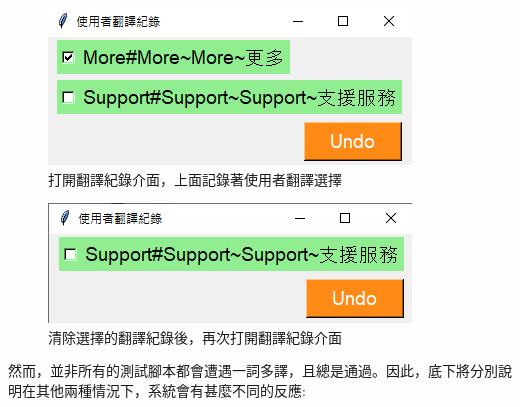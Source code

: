 \begin{figure}[H]
\centering
\includegraphics[width= .5\textwidth]{../論文截圖/4-3-4 介面上記錄著使用者翻譯選擇.png}
\caption{打開翻譯紀錄介面，上面記錄著使用者翻譯選擇}
\end{figure}

\begin{figure}[H]
\centering
\includegraphics[width= .5\textwidth]{../論文截圖/4-3-5 將選擇的翻譯清除後，再次打開翻譯紀錄介面.png}
\caption{清除選擇的翻譯紀錄後，再次打開翻譯紀錄介面}
\end{figure}

然而，並非所有的測試腳本都會遭遇一詞多譯，且總是通過。因此，底下將分別說明在其他兩種情況下，系統會有甚麼不同的反應:

